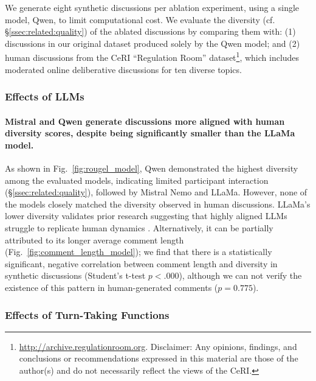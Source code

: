 We generate eight synthetic discussions per ablation experiment, using a single model, Qwen, to limit computational cost. We evaluate the diversity (cf. \S\ref{ssec:related:quality}) of the ablated discussions by comparing them with: (1) discussions in our original dataset produced solely by the Qwen model; and (2) human discussions from the \ac{CeRI} “Regulation Room” dataset\footnote{\url{http://archive.regulationroom.org}. Disclaimer: Any opinions, findings, and conclusions or recommendations expressed in this material are those of the author(s) and do not necessarily reflect the views of the \ac{CeRI}.}, which includes moderated online deliberative discussions for ten diverse topics.


\subsubsection{Effects of LLMs}

\paragraph{Mistral and Qwen generate discussions more aligned with human diversity scores, despite being significantly smaller than the LLaMa model.} As shown in Fig.~\ref{fig:rougel_model}, Qwen demonstrated the highest diversity among the evaluated models, indicating limited participant interaction (\S\ref{ssec:related:quality}), followed by Mistral Nemo and LLaMa. However, none of the models closely matched the diversity observed in human discussions. 
LLaMa's lower diversity validates prior research suggesting that highly aligned \acp{LLM} struggle to replicate human dynamics \cite{Park2023GenerativeAI, leng_2024}. Alternatively, it can be partially attributed to its longer average comment length (Fig.~\ref{fig:comment_length_model}); we find that there is a statistically significant, negative correlation between comment length and diversity in synthetic discussions (Student's t-test  $p < .000$), although we can not verify the existence of this pattern in human-generated comments ($p = 0.775$).


\subsubsection{Effects of Turn-Taking Functions}

